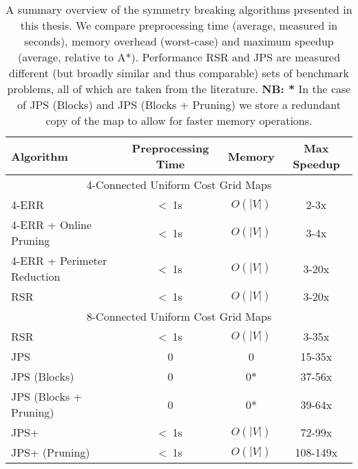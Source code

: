 {\setlength{\tabcolsep}{0.4em}
\begin{table}[tb]
\centering
\begin{tabular}{|l|c|c|c|}
  \hline
\textbf{Algorithm} & \textbf{Preprocessing Time} & \textbf{Memory} & \textbf{Max Speedup} \\ \hline 
\multicolumn{4}{c}{4-Connected Uniform Cost Grid Maps} \\ \hline
4-ERR & <~1s & $O(|V|)$ & 2-3x \\ \hline
4-ERR + Online Pruning & <~1s & $O(|V|)$ & 3-4x \\ \hline
4-ERR + Perimeter  Reduction &  <~1s & $O(|V|)$ & 3-20x \\ \hline
RSR & <~1s & $O(|V|)$ & 3-20x \\ \hline
\multicolumn{4}{c}{8-Connected Uniform Cost Grid Maps} \\ \hline
RSR &  <~1s & $O(|V|)$ & 3-35x \\ 
JPS & 0 & 0 & 15-35x  \\
JPS (Blocks) & 0 & 0* & 37-56x   \\
JPS (Blocks + Pruning) & 0 & 0* & 39-64x  \\
JPS+ & <~1s & $O(|V|)$  & 72-99x \\
JPS+ (Pruning) & <~1s & $O(|V|)$  & 108-149x  \\
\hline
\end{tabular}
\caption[A summary overview of all RSR, JPS and their variants.]
{\small 
A summary overview of the symmetry breaking algorithms presented in this
thesis.  We compare preprocessing time (average, measured in seconds), memory
overhead (worst-case) and maximum speedup (average, relative to A{*}). 
Performance RSR and JPS are measured different (but broadly similar and thus
comparable) sets of benchmark problems, all of which are taken from the literature.  
\textbf{NB: *} In the case
of JPS (Blocks) and JPS (Blocks + Pruning) we store a redundant copy of the
map to allow for faster memory operations.
}
\label{table::conclusion::overview}
\end{table}
}
